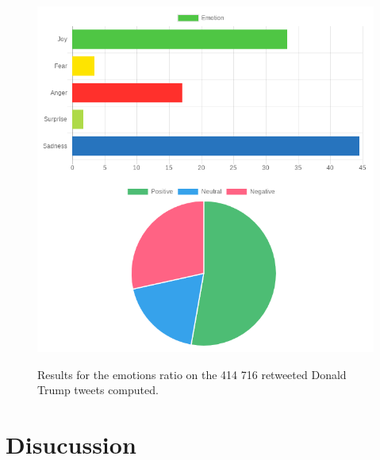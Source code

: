 \documentclass{acmtog} %
\begin{document}
\begin{figure}[h!]
{\includegraphics[width=\linewidth]{retweeted_emotion_sentiment_trump-exemple.png}}
\caption{Results for the emotions ratio on the 414 716 retweeted Donald Trump tweets computed.}
  \label{fig:trump_results}
\end{figure}


\section{Disucussion}
\label{sec:discussion}
\end{document}
